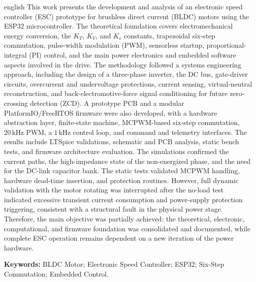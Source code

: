 \documentclass[12pt, a4paper, openright, oneside, chapter=TITLE, brazilian]{abntex2}
\begin{document}
\begin{resumo}[Abstract]
\begin{otherlanguage*}{english}
This work presents the development and analysis of an electronic speed controller (ESC) prototype for brushless direct current (BLDC) motors using the ESP32 microcontroller. The theoretical foundation covers electromechanical energy conversion, the $K_T$, $K_V$, and $K_e$ constants, trapezoidal six-step commutation, pulse-width modulation (PWM), sensorless startup, proportional-integral (PI) control, and the main power electronics and embedded software aspects involved in the drive. The methodology followed a systems engineering approach, including the design of a three-phase inverter, the DC bus, gate-driver circuits, overcurrent and undervoltage protections, current sensing, virtual-neutral reconstruction, and back-electromotive-force signal conditioning for future zero-crossing detection (ZCD). A prototype PCB and a modular PlatformIO/FreeRTOS firmware were also developed, with a hardware abstraction layer, finite-state machine, MCPWM-based six-step commutation, $20\,\text{kHz}$ PWM, a $1\,\text{kHz}$ control loop, and command and telemetry interfaces. The results include LTSpice validations, schematic and PCB analysis, static bench tests, and firmware architecture evaluation. The simulations confirmed the current paths, the high-impedance state of the non-energized phase, and the need for the DC-link capacitor bank. The static tests validated MCPWM handling, hardware dead-time insertion, and protection routines. However, full dynamic validation with the motor rotating was interrupted after the no-load test indicated excessive transient current consumption and power-supply protection triggering, consistent with a structural fault in the physical power stage. Therefore, the main objective was partially achieved: the theoretical, electronic, computational, and firmware foundation was consolidated and documented, while complete ESC operation remains dependent on a new iteration of the power hardware.
    \par\vspace{\onelineskip}
    \noindent\textbf{Keywords:} BLDC Motor; Electronic Speed Controller; ESP32; Six-Step Commutation; Embedded Control.
\end{otherlanguage*}
\end{resumo}


\newpage
{}
\listoffigures*
\cleardoublepage
\end{document}
